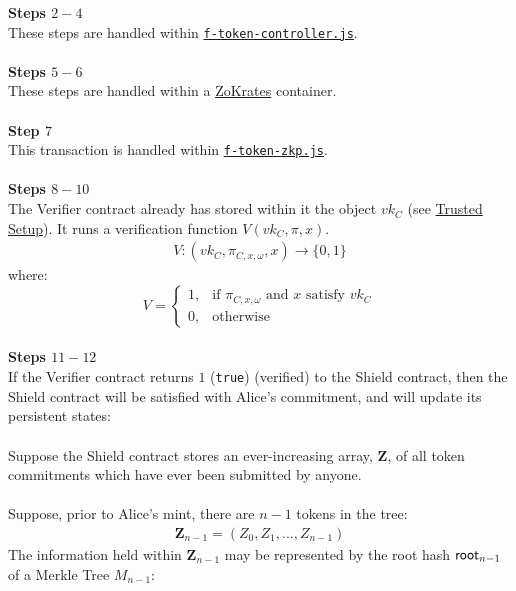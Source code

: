 \textbf{Steps $2 - 4$}
\ \\
These steps are handled within \hyperref[sec:f-token-controller]{\texttt{f-token-controller.js}}.\\
\\

\textbf{Steps $5 - 6$}
\ \\
These steps are handled within a \hyperref[sec:zokrates]{ZoKrates} container.\\
\\

\textbf{Step $7$}
\ \\
This transaction is handled within \hyperref[sec:f-token-zkp]{\texttt{f-token-zkp.js}}.\\
\\

\textbf{Steps $8 - 10$}
\ \\
The Verifier contract already has stored within it the object $vk_C$ (see \hyperref[sec:trustedSetup]{Trusted Setup}). It runs a verification function $V(vk_C, \pi , x)$.
\begin{align*}
  V: (vk_C, \pi_{C,x,\omega}, x) \to \{0,1\}
\end{align*}
where:
\[
    V=
\begin{cases}
    1,& \text{if } \pi_{C,x,\omega} \text{ and } x \text{ satisfy } vk_C\\
    0,& \text{otherwise}
\end{cases}
\]
\ \\



\textbf{Steps $11 - 12$}
\ \\
If the Verifier contract returns $1$ (\texttt{true}) (verified) to the Shield contract, then the Shield contract will be satisfied with Alice's commitment, and will update its persistent states:\\
\\
Suppose the Shield contract stores an ever-increasing array, $\bm{Z}$, of all token commitments which have ever been submitted by anyone.\\
\\
Suppose, prior to Alice's mint, there are $n-1$ tokens in the tree:
\begin{align*}
  \bm{Z}_{n-1} = (Z_0, Z_1, ..., Z_{n-1})
\end{align*}
The information held within $\bm{Z}_{n-1}$ may be represented by the root hash $\mathsf{root}_{n-1}$ of a Merkle Tree $M_{n-1}$:\\


